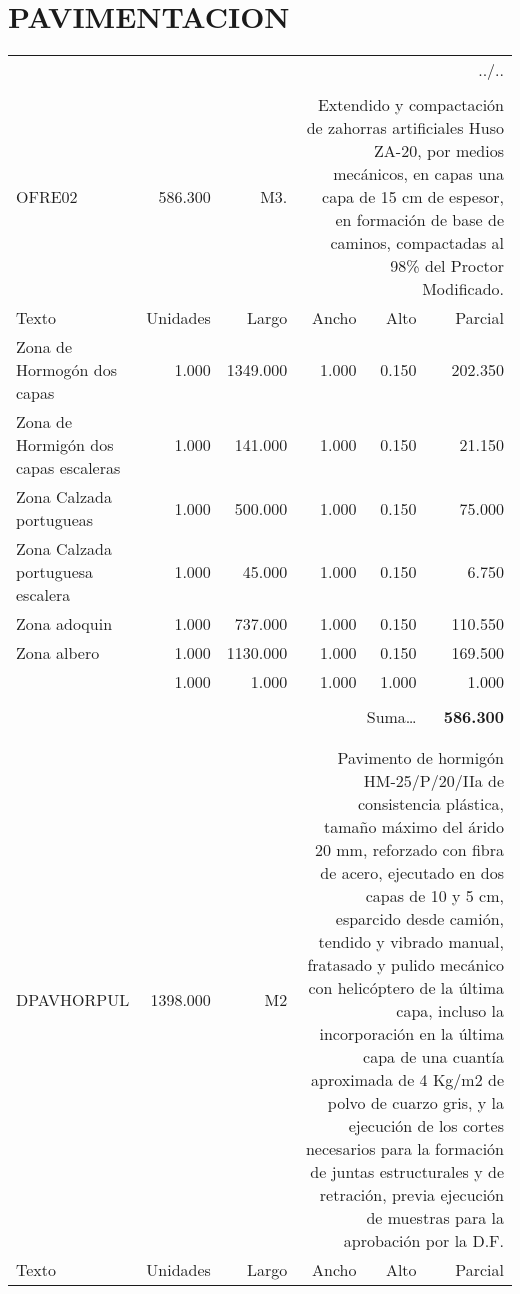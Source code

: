 \documentclass{book}%
\begin{document}
%
\section{PAVIMENTACION}%
\label{sec:PAVIMENTACION}%
\begin{longtable}{lrrrrr}%
\multicolumn{6}{r}{../..}\\%
\endfoot%
\endlastfoot%
&&&&&\\%
OFRE02&586.300& M3.&\multicolumn{3}{p{6cm}}{\scriptsize Extendido y compactación de zahorras artificiales Huso ZA-20, por medios mecánicos, en capas una capa de 15 cm de espesor, en formación de base de caminos, compactadas al 98\% del Proctor Modificado.\normalsize}\\%
Texto&Unidades&Largo&Ancho&Alto&Parcial\\%
\hline%
\multicolumn{1}{p{3.5cm}}{Zona de Hormogón dos capas}&1.000&1349.000&1.000&0.150&202.350\\%
\multicolumn{1}{p{3.5cm}}{Zona de Hormigón dos capas escaleras}&1.000&141.000&1.000&0.150&21.150\\%
\multicolumn{1}{p{3.5cm}}{Zona Calzada portugueas}&1.000&500.000&1.000&0.150&75.000\\%
\multicolumn{1}{p{3.5cm}}{Zona Calzada portuguesa escalera}&1.000&45.000&1.000&0.150&6.750\\%
\multicolumn{1}{p{3.5cm}}{Zona adoquin}&1.000&737.000&1.000&0.150&110.550\\%
\multicolumn{1}{p{3.5cm}}{Zona albero}&1.000&1130.000&1.000&0.150&169.500\\%
\multicolumn{1}{p{3.5cm}}{}&1.000&1.000&1.000&1.000&1.000\\%
&&&&&\\%
\multicolumn{5}{r}{Suma\ldots}&\textbf{586.300}\\%
\hline%
&&&&&\\%
&&&&&\\%
DPAVHORPUL&1398.000& M2&\multicolumn{3}{p{6cm}}{\scriptsize Pavimento de hormigón HM-25/P/20/IIa de consistencia plástica, tamaño máximo del árido 20 mm, reforzado con fibra de acero, ejecutado en dos capas de 10 y 5 cm, esparcido desde camión, tendido y vibrado manual, fratasado y pulido mecánico con helicóptero de la última capa, incluso la incorporación en la última capa de una cuantía aproximada de 4 Kg/m2 de polvo de cuarzo gris, y la ejecución de los cortes necesarios para la formación de juntas estructurales y de retración, previa ejecución de muestras para la aprobación por la D.F.\normalsize}\\%
Texto&Unidades&Largo&Ancho&Alto&Parcial\\%

\end{longtable}
\end{document}
